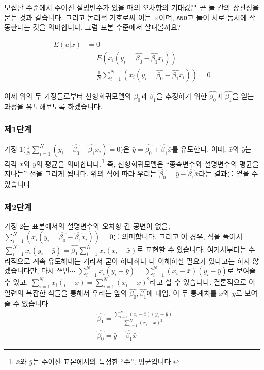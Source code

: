 \documentclass[
]{book}
\begin{document}
모집단 수준에서 주어진 설명변수가 있을 때의 오차항의 기대값은 곧 둘 간의 상관성을 묻는 것과 같습니다. 그리고 논리적 기호로써 이는 \(\times\)이며, \texttt{AND}고 둘이 서로 동시에 작동한다는 것을 의미합니다. 그럼 표본 수준에서 살펴볼까요?

\begin{equation*}
\begin{aligned}
E(u|x)&= 0\\
&= E(x_i(y_i=\hat{\beta_0}-\hat{\beta_1}x_i))\\
&= \frac{1}{N}\sum^{N}_{i=1}(x_i(y_i=\hat{\beta_0}-\hat{\beta_1}x_i)) = 0
\end{aligned}
\end{equation*}

이제 위의 두 가정들로부터 선형회귀모델의 \(\beta_0\)과 \(\beta_1\)을 추정하기 위한 \(\hat{\beta_0}\)과 \(\hat{\beta_1}\)을 얻는 과정을 유도해보도록 하겠습니다.

\hypertarget{uxc81c1uxb2e8uxacc4}{%
\subsubsection{제1단계}\label{uxc81c1uxb2e8uxacc4}}

가정 1(\(\frac{1}{N}\sum^{N}_{i=1}(y_i-\hat{\beta_0}-\hat{\beta_1}x_i)=0\))은 \(\bar{y}=\hat{\beta_0}+\hat{\beta_1}\bar{x}\)를 유도한다. 이때, \(\bar{x}\)와 \(\bar{y}\)는 각각 \(x\)와 \(y\)의 평균을 의미합니다.\footnote{\(\bar{x}\)와 \(\bar{y}\)는 주어진 표본에서의 특정한 ``수'', 평균입니다.} 즉, 선형회귀모델은 ``종속변수와 설명변수의 평균을 지나는'' 선을 그리게 됩니다. 위의 식에 따라 우리는 \(\hat{\beta_0} = \bar{y}-\hat{\beta_1}\bar{x}\)라는 결과를 얻을 수 있습니다.

\hypertarget{uxc81c2uxb2e8uxacc4}{%
\subsubsection{제2단계}\label{uxc81c2uxb2e8uxacc4}}

가정 2는 표본에서의 설명변수와 오차항 간 공변이 없을, \(\sum^{N}_{i=1}(x_i(y_i=\hat{\beta_0}-\hat{\beta_1}x_i)) = 0\)를 의미합니다. 그리고 이 경우, 식을 풀어서 \(\sum^{N}_{i=1}x_i(y_i-\bar{y})=\hat{\beta_1}\sum^{N}_{i=1}x_i(x_i-\bar{x})\)로 표현할 수 있습니다. 여기서부터는 수리적으로 계속 유도해내는 거라서 굳이 하나하나 다 이해하실 필요가 있다고는 하지 않겠습니다만, 다시 쓰면\(\cdots\)
\(\sum^{N}_{i=1}x_i(y_i-\bar{y})=\sum^{N}_{i=1}(x_i-\bar{x})(y_i-\bar{y})\)로 보여줄 수 있고, \(\sum^{N}_{i=1}x_i(_i-\bar{x})=\sum^{N}_{i=1}(x_i-\bar{x})^2\)라고 할 수 있습니다. 결론적으로 이 일련의 복잡한 식들을 통해서 우리는 앞의 \(\hat{\beta_0}, \hat{\beta_1}\)에 대입, 이 두 통계치를 \(x\)와 \(y\)로 보여줄 수 있습니다.
\begin{equation*}
\begin{aligned}
&\hat{\beta_1}=\frac{\sum^{N}_{i=1}(x_i-\bar{x})(y_i-\bar{y})}{\sum^{N}_{i=1}(x_i-\bar{x})^2}\\
&\hat{\beta_0} = \bar{y}-\hat{\beta_1}\bar{x}
\end{aligned}
\end{equation*}
\end{document}

